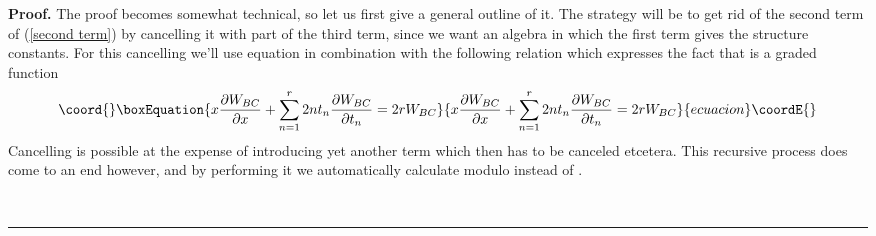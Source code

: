 \documentclass[a4paper,11pt]{article}
\newenvironment{proof}[1][Proof]{\textbf{#1.} }{\ \rule{0.5em}{0.5em}}
\numberwithin{equation}{section}
\begin{document}
\begin{proof}
\noindent The proof becomes somewhat technical, so let us first
give a general outline of it. The strategy will be to get rid of the second
term of (\ref{second term}) by cancelling it with part of the third term,
since we want an algebra in which the first term gives the structure
constants. For this cancelling we'll use equation \myHighlight{$\left( \ref{Ctilde}%
\right) $}\coordHE{} in combination with the following relation which expresses the
fact that \coordHE{} is a graded function
\begin{equation}\coord{}\boxEquation{
x\frac{\partial W_{BC}}{\partial x}+\sum_{n=1}^{r}2nt_{n}\frac{\partial
W_{BC}}{\partial t_{n}}=2rW_{BC}  \label{scaling}
}{
x\frac{\partial W_{BC}}{\partial x}+\sum_{n=1}^{r}2nt_{n}\frac{\partial
W_{BC}}{\partial t_{n}}=2rW_{BC}  }{ecuacion}\coordE{}\end{equation}
Cancelling is possible at the expense of introducing yet another term which
then has to be canceled etcetera. This recursive process does come to an end
however, and by performing it we automatically calculate modulo \coordHE{} instead of \coordHE{}.
  

\end{proof}
\end{document}
